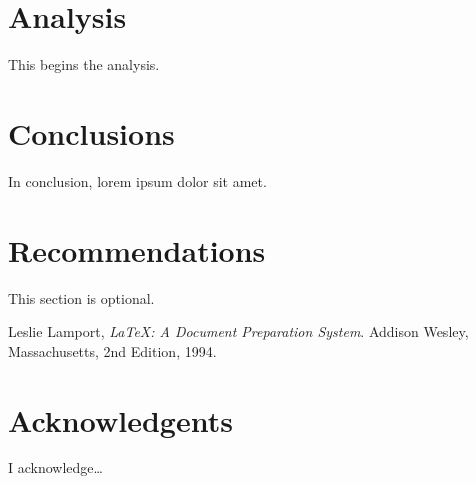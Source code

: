 \documentclass[12pt]{article}
\begin{document}
\section{Analysis}
This begins the analysis. \lipsum[20]

\section{Conclusions}
In conclusion, lorem ipsum dolor sit amet. \lipsum[20]

\section{Recommendations}
This section is optional. \lipsum[20]

\newpage

\begin{thebibliography}{999}

  Leslie Lamport,
  \emph{\LaTeX: A Document Preparation System}.
  Addison Wesley, Massachusetts,
  2nd Edition,
  1994.

\end{thebibliography}

\newpage

\section{Acknowledgents}
I acknowledge\dots \lipsum[20]
\end{document}

